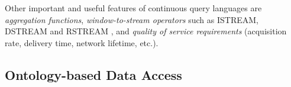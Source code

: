 Other important and useful features of continuous query languages are \emph{aggregation functions},
\emph{window-to-stream operators} such as \textsf{ISTREAM, DSTREAM} and \textsf{RSTREAM} \cite{Arasu_2006}, and
\emph{quality of service requirements} \cite{Galpin_09} (acquisition rate, delivery time, network lifetime, etc.).





\subsection{Ontology-based Data Access}
\label{obda}

